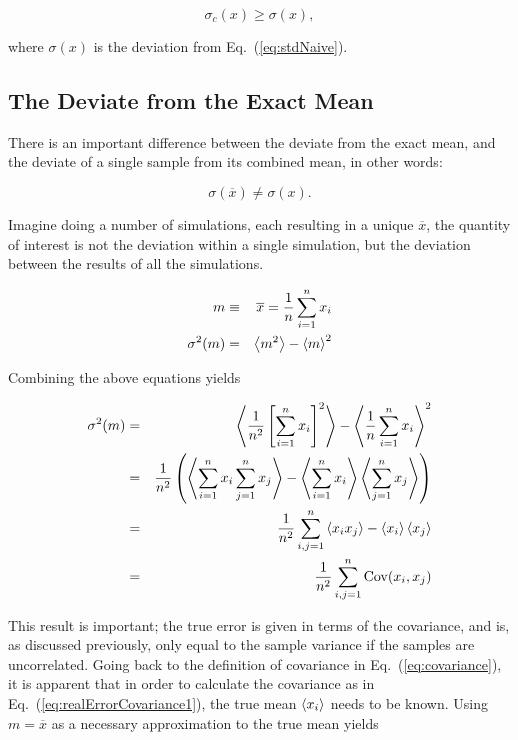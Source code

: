 \begin{equation}
 \label{eq:trueVsNaiveSTD}
 \sigma_c(x) \ge \sigma(x),
\end{equation}

where $\sigma(x)$ is the deviation from Eq.~(\ref{eq:stdNaive}). 


\subsection{The Deviate from the Exact Mean}

There is an important difference between the deviate from the exact mean, and the deviate of a single sample from its combined mean, in other words:

\begin{equation}
 \sigma(\overline{x}) \ne \sigma(x).
\end{equation}

Imagine doing a number of simulations, each resulting in a unique $\overline{x}$, the quantity of interest is not the deviation within a single simulation, but the deviation between the results of all the simulations.

\begin{eqnarray}
 m &\equiv& \overline{x} = \frac{1}{n}\sum_{i=1}^n x_i \label{eq:meanx}\\
 \sigma^2(m) &=& \left< m^2 \right> - \left< m \right>^2 \label{eq:sigma_m}
\end{eqnarray}

Combining the above equations yields

\begin{eqnarray}
\label{eq:realErrorCovariance1}
  \sigma^2(m) &=& \left< \frac{1}{n^2}\left[\sum_{i=1}^nx_i\right]^2 \right> - \left< \frac{1}{n}\sum_{i=1}^n x_i \right>^2 \nonumber\\
              &=& \frac{1}{n^2}\left( \left< \sum_{i=1}^n x_i\sum_{j=1}^n x_j \right> - \left< \sum_{i=1}^n x_i \right>\left< \sum_{j=1}^n x_j \right>  \right) \nonumber\\
              &=& \frac{1}{n^2}\sum_{i,j=1}^n \left< x_ix_j \right> - \left< x_i \right>\left< x_j \right> \nonumber\\
              &=& \frac{1}{n^2}\sum_{i,j=1}^n \mathrm{Cov}(x_i, x_j)
\end{eqnarray}

This result is important; the true error is given in terms of the covariance, and is, as discussed previously, only equal to the sample variance if the samples are uncorrelated. Going back to the definition of covariance in Eq.~(\ref{eq:covariance}), it is apparent that in order to calculate the covariance as in Eq.~(\ref{eq:realErrorCovariance1}), the true mean $\left< x_i \right>$ needs to be known. Using $m=\overline{x}$ as a necessary approximation to the true mean yields   

